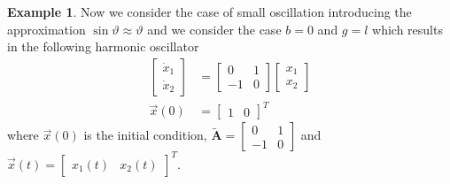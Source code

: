 \documentclass[11pt,a4paper,oneside]{book}
\numberwithin{equation}{section}
\theoremstyle{it}
\theoremstyle{definition}
\newtheorem{example}{Example}[chapter]
\begin{document}
\begin{example}
Now we consider the case of small oscillation introducing the approximation $\sin\vartheta\approx\vartheta$ and we consider the case $b=0$ and $g=l$ which results in the following harmonic oscillator
\begin{equation}
	\begin{aligned}
		\begin{bmatrix} \dot{x}_1 \\ \dot{x}_2 \end{bmatrix} &= \begin{bmatrix} 0 & 1 \\ -1 & 0 \end{bmatrix} \begin{bmatrix} {x}_1 \\ {x}_2 \end{bmatrix} \\[6pt]
		\vec{x}(0) &= \begin{bmatrix} 1 & 0 \end{bmatrix}^T
	\end{aligned}
\end{equation}
where $\vec{x}(0)$ is the initial condition, $\tilde{\mathbf{A}} = 
\begin{bmatrix} 0 & 1 \\ -1 & 0 \end{bmatrix}$ and $\vec{x}(t)= \begin{bmatrix} 
x_1(t) & x_2(t) \end{bmatrix}^T$.


\end{example}
\end{document}
